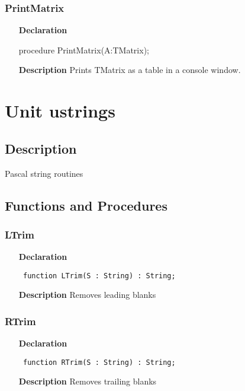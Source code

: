 \documentclass[12pt,a4paper,oneside]{report}
\newcommand{\declarationitem}[1]{\textbf{#1}}
\newcommand{\descriptiontitle}[1]{\textbf{#1}}
\newcommand{\code}[1]{\texttt{#1}}
\begin{document}
\subsubsection{PrintMatrix}
\label{uvecmatprn:PrintMatrix}
\begin{itemize}
	\item[\declarationitem{Declaration}\hfill]
	\begin{flushleft}
	procedure PrintMatrix(A:TMatrix);
	\end{flushleft}
	\item[\descriptiontitle{Description}\hfill]
	Prints TMatrix as a table in a console window.
\end{itemize}
\section{Unit ustrings}
\label{ustrings}
\subsection{Description}
Pascal string routines 
\subsection{Functions and Procedures}
\subsubsection{LTrim}
\label{ustrings-LTrim}
\begin{itemize}\item[\declarationitem{Declaration}\hfill]
	\begin{flushleft}
		\code{
			function LTrim(S : String) : String;}
		
	\end{flushleft}
	
	\par
	\item[\descriptiontitle{Description}]
	Removes leading blanks
	
\end{itemize}
\subsubsection{RTrim}
\label{ustrings-RTrim}
\begin{itemize}\item[\declarationitem{Declaration}\hfill]
	\begin{flushleft}
		\code{
			function RTrim(S : String) : String;}
		
	\end{flushleft}
	
	\par
	\item[\descriptiontitle{Description}]
	Removes trailing blanks
	
\end{itemize}
\end{document}
